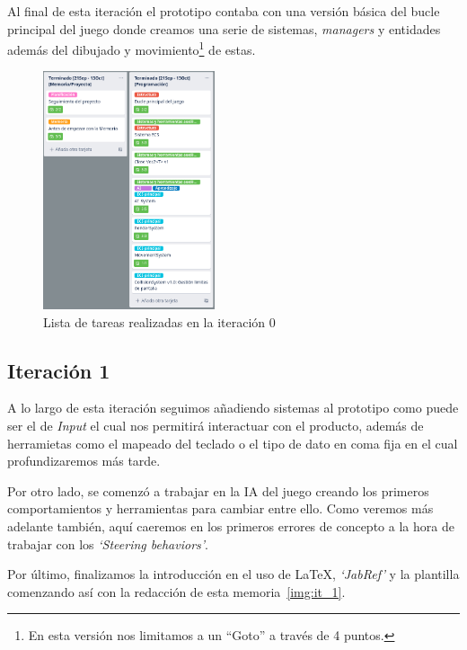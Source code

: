 Al final de esta iteración el prototipo contaba con una versión básica del bucle principal
del juego donde creamos una serie de sistemas, \textit{managers} y entidades además del dibujado
y movimiento\footnote{En esta versión nos limitamos a un ``Goto'' a través de 4 puntos.} de 
estas.

\begin{figure}[ht]
\centering
\includegraphics[width=0.45\textwidth]{imagenes/metodologia/tareas_it0.png}
\caption{Lista de tareas realizadas en la iteración 0}
\label{img:it_0}
\end{figure}

\subsection{Iteración 1}
A lo largo de esta iteración seguimos añadiendo sistemas al prototipo como puede ser el
de \textit{Input} el cual nos permitirá interactuar con el producto, además de herramietas
como el mapeado del teclado o el tipo de dato en coma fija en el cual profundizaremos más tarde.

Por otro lado, se comenzó a trabajar en la \ac{IA} del juego creando los primeros comportamientos
y herramientas para cambiar entre ello. Como veremos más adelante también, aquí caeremos en los primeros
errores de concepto a la hora de trabajar con los \textit{`Steering behaviors'}.

Por último, finalizamos la introducción en el uso de \LaTeX, \textit{`JabRef'} y la plantilla comenzando 
así con la redacción de esta memoria~\ref{img:it_1}.

